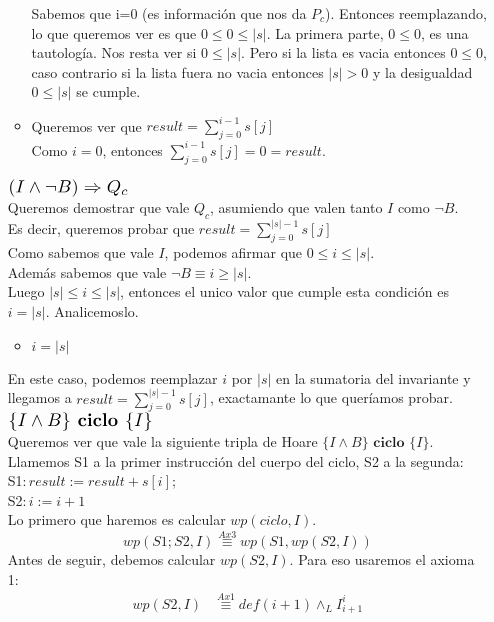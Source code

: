 \documentclass{article}
\begin{document}
\begin{enumerate}[label=\alph*)]
\begin{itemize}
		Sabemos que i=0 (es información que nos da $P_c$). Entonces reemplazando, lo que queremos ver es que 
		$0\leq 0\leq |s|$. La primera parte, $0\leq 0$, es una tautología. Nos resta ver si $0\leq |s|$. Pero si la lista es
		vacia entonces $0\leq 0$, caso contrario si la lista fuera no vacia entonces $|s|>0$ y la desigualdad $0\leq |s|$ 
		se cumple.
		\item Queremos ver que $result=\sum_{j=0}^{i-1}s[j]$\\
		Como $i=0$, entonces $\sum_{j=0}^{i-1}s[j]=0=result$.
	\end{itemize}	 
	$\scalebox{1.3}{$(I\wedge \neg B)\Rightarrow Q_c$}$\smallskip \\
	Queremos demostrar que vale $Q_c$, asumiendo que valen tanto $I$ como $\neg B$.\\ Es decir, queremos probar que 
	$result =\sum_{j=0}^{|s|-1}s[j]$\\
	Como sabemos que vale $I$, podemos afirmar que $0\leq i\leq |s|$.\\ Además sabemos que vale $\neg B\equiv i\geq |s|$.
	\\ Luego $|s|\leq i\leq |s|$, entonces el unico valor que cumple esta condición es $i=|s|$. Analicemoslo.\\
	\begin{itemize}
	\item $i=|s|$
	\end{itemize}
	En este caso, podemos reemplazar $i$ por $|s|$ en la sumatoria del invariante y llegamos a $result =\sum_{j=0}^{|s|-1}s[j]$, exactamante lo que queríamos probar.\medskip \\
	$\scalebox{1.3}{$\{I\wedge B\} \textbf{ ciclo } \{I\}$}$\medskip \\
	Queremos ver que vale la siguiente tripla de Hoare $\{I\wedge B\} \textbf{ ciclo } \{I\}$.\\
	Llamemos S1 a la primer instrucción del cuerpo del ciclo, S2 a la segunda:\\
	S1$: result:=result+s[i];$\\
	S2$: i:=i+1$\\
	Lo primero que haremos es calcular $wp(ciclo,I)$.
	\begin{equation}wp(S1;S2,I)\stackrel{Ax3}{\equiv}wp(S1,wp(S2,I))\end{equation}
	Antes de seguir, debemos calcular $wp(S2,I)$. Para eso usaremos el axioma 1:
	\begin{align*}
	wp(S2,I)&\stackrel{Ax1}{\equiv}def(i+1)\wedge_L I_{i+1}^{i}\\

\end{align*}
\end{enumerate}
\end{document}

